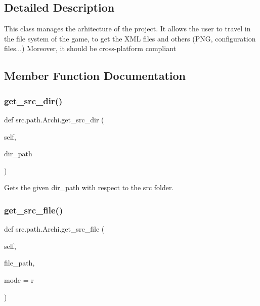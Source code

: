 \subsection{Detailed Description}
\begin{DoxyVerb}This class manages the arhitecture of the project.
It allows the user to travel in the file system of the game, to get
the XML files and others (PNG, configuration files...)
Moreover, it should be cross-platform compliant
\end{DoxyVerb}
 

\subsection{Member Function Documentation}
\hypertarget{classsrc_1_1path_1_1_archi_ae71e9ba49e5ed1728315339d651c9db6}{}\label{classsrc_1_1path_1_1_archi_ae71e9ba49e5ed1728315339d651c9db6} 
\subsubsection{\texorpdfstring{get\+\_\+src\+\_\+dir()}{get\_src\_dir()}}
{\footnotesize\ttfamily def src.\+path.\+Archi.\+get\+\_\+src\+\_\+dir (\begin{DoxyParamCaption}\item[{}]{self,  }\item[{}]{dir\+\_\+path }\end{DoxyParamCaption})}

\begin{DoxyVerb}Gets the given dir_path with respect to the src folder.
\end{DoxyVerb}
 \hypertarget{classsrc_1_1path_1_1_archi_ae62f2a91aebfa1be024b7db7ec22fcb2}{}\label{classsrc_1_1path_1_1_archi_ae62f2a91aebfa1be024b7db7ec22fcb2} 
\subsubsection{\texorpdfstring{get\+\_\+src\+\_\+file()}{get\_src\_file()}}
{\footnotesize\ttfamily def src.\+path.\+Archi.\+get\+\_\+src\+\_\+file (\begin{DoxyParamCaption}\item[{}]{self,  }\item[{}]{file\+\_\+path,  }\item[{}]{mode = {\ttfamily \textquotesingle{}r\textquotesingle{}} }\end{DoxyParamCaption})}

